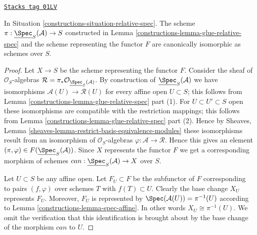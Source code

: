 \begin{lemma}
\label{constructions-lemma-glueing-gives-functor-spec}
\href{https://stacks.math.columbia.edu/tag/01LV}{\texttt{Stacks tag 01LV}}

In Situation \ref{constructions-situation-relative-spec}.
The scheme $\pi : \underline{\Spec}_S(\mathcal{A}) \to S$
constructed in Lemma \ref{constructions-lemma-glue-relative-spec}
and the scheme representing the functor $F$ are
canonically isomorphic as schemes over $S$.
\end{lemma}

\begin{proof}

Let $X \to S$ be the scheme representing the functor $F$.
Consider the sheaf of $\mathcal{O}_S$-algebras
$\mathcal{R} = \pi_*\mathcal{O}_{\underline{\Spec}_S(\mathcal{A})}$.
By construction of $\underline{\Spec}_S(\mathcal{A})$
we have isomorphisms $\mathcal{A}(U) \to \mathcal{R}(U)$
for every affine open $U \subset S$; this follows from
Lemma \ref{constructions-lemma-glue-relative-spec} part (1).
For $U \subset U' \subset S$ open these isomorphisms are
compatible with the restriction mappings; this follows from
Lemma \ref{constructions-lemma-glue-relative-spec} part (2).
Hence by Sheaves, Lemma \ref{sheaves-lemma-restrict-basis-equivalence-modules}
these isomorphisms result from an isomorphism of $\mathcal{O}_S$-algebras
$\varphi : \mathcal{A} \to \mathcal{R}$. Hence this gives an element
$(\pi, \varphi) \in F(\underline{\Spec}_S(\mathcal{A}))$.
Since $X$ represents the functor $F$ we get a corresponding
morphism of schemes $can : \underline{\Spec}_S(\mathcal{A}) \to X$
over $S$.

\medskip\noindent
Let $U \subset S$ be any affine open. Let $F_U \subset F$ be
the subfunctor of $F$ corresponding to pairs $(f, \varphi)$ over
schemes $T$ with $f(T) \subset U$. Clearly the base change
$X_U$ represents $F_U$. Moreover, $F_U$ is represented by
$\Spec(\mathcal{A}(U)) = \pi^{-1}(U)$ according to
Lemma \ref{constructions-lemma-spec-affine}. In other words $X_U \cong \pi^{-1}(U)$.
We omit the verification that this identification is brought about
by the base change of the morphism $can$ to $U$.
\end{proof}

